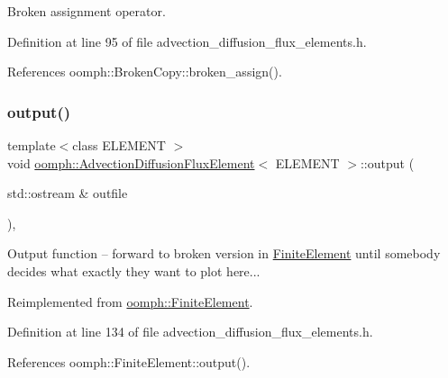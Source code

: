 Broken assignment operator. 



Definition at line 95 of file advection\+\_\+diffusion\+\_\+flux\+\_\+elements.\+h.



References oomph\+::\+Broken\+Copy\+::broken\+\_\+assign().

\mbox{\label{classoomph_1_1AdvectionDiffusionFluxElement_a23efe876b380f81188dcb506ac24266b}} 
\subsubsection{\texorpdfstring{output()}{output()}\hspace{0.1cm}{\footnotesize\ttfamily [1/2]}}
{\footnotesize\ttfamily template$<$class E\+L\+E\+M\+E\+NT $>$ \\
void \hyperlink{classoomph_1_1AdvectionDiffusionFluxElement}{oomph\+::\+Advection\+Diffusion\+Flux\+Element}$<$ E\+L\+E\+M\+E\+NT $>$\+::output (\begin{DoxyParamCaption}\item[{std\+::ostream \&}]{outfile }\end{DoxyParamCaption})\hspace{0.3cm}{\ttfamily [inline]}, {\ttfamily [virtual]}}



Output function -- forward to broken version in \hyperlink{classoomph_1_1FiniteElement}{Finite\+Element} until somebody decides what exactly they want to plot here... 



Reimplemented from \hyperlink{classoomph_1_1FiniteElement_a2ad98a3d2ef4999f1bef62c0ff13f2a7}{oomph\+::\+Finite\+Element}.



Definition at line 134 of file advection\+\_\+diffusion\+\_\+flux\+\_\+elements.\+h.



References oomph\+::\+Finite\+Element\+::output().

\mbox{\label{classoomph_1_1AdvectionDiffusionFluxElement_a6a080d1e107612072d9069f909a2b5b0}} 
